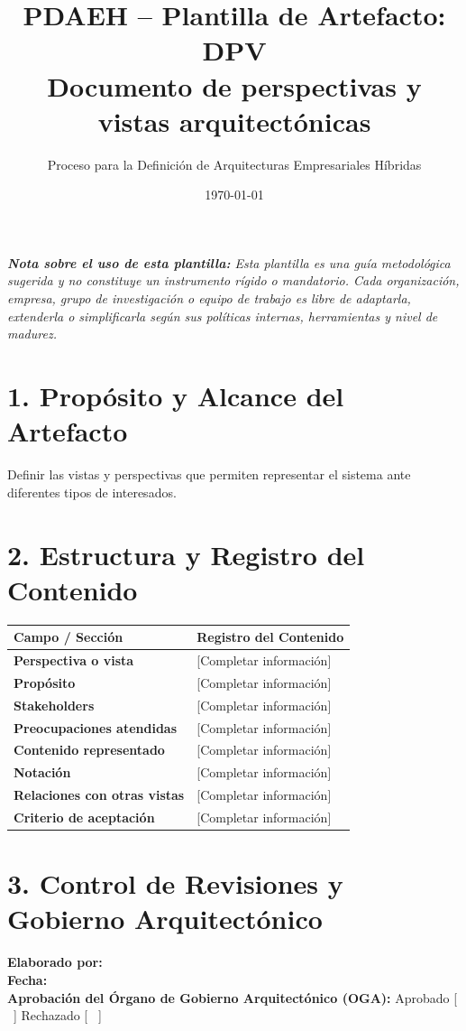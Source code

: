 \documentclass[11pt,a4paper]{article}
\title{\textbf{\color{brandgreen} PDAEH -- Plantilla de Artefacto: DPV} \\[0.3em] \large Documento de perspectivas y vistas arquitectónicas}
\author{Proceso para la Definición de Arquitecturas Empresariales Híbridas}
\date{\today}
\begin{document}
\maketitle

\noindent \textit{\textbf{Nota sobre el uso de esta plantilla:} Esta plantilla es una guía metodológica sugerida y no constituye un instrumento rígido o mandatorio. Cada organización, empresa, grupo de investigación o equipo de trabajo es libre de adaptarla, extenderla o simplificarla según sus políticas internas, herramientas y nivel de madurez.}

\section*{1. Propósito y Alcance del Artefacto}
Definir las vistas y perspectivas que permiten representar el sistema ante diferentes tipos de interesados.

\section*{2. Estructura y Registro del Contenido}
\begin{tabularx}{\textwidth}{|>{\bfseries}p{4.5cm}|X|}
    \hline
    \rowcolor[gray]{0.92} Campo / Sección & Registro del Contenido \\ \hline
    \textbf{Perspectiva o vista} & [Completar información] \\ \hline
    \textbf{Propósito} & [Completar información] \\ \hline
    \textbf{Stakeholders} & [Completar información] \\ \hline
    \textbf{Preocupaciones atendidas} & [Completar información] \\ \hline
    \textbf{Contenido representado} & [Completar información] \\ \hline
    \textbf{Notación} & [Completar información] \\ \hline
    \textbf{Relaciones con otras vistas} & [Completar información] \\ \hline
    \textbf{Criterio de aceptación} & [Completar información] \\ \hline
\end{tabularx}

\vspace{1.2cm}
\section*{3. Control de Revisiones y Gobierno Arquitectónico}
\noindent \textbf{Elaborado por:} \hrulefill \\[0.5em]
\textbf{Fecha:} \hrulefill \\[0.5em]
\textbf{Aprobación del Órgano de Gobierno Arquitectónico (OGA):} Aprobado [ \, ] \quad Rechazado [ \, ]
\end{document}
